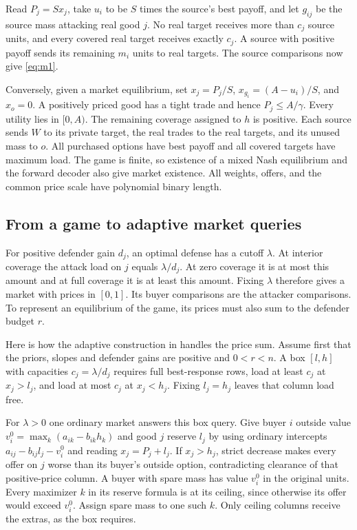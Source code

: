 \documentclass[11pt]{article}
\begin{document}
Read \(P_j=Sx_j\), take \(u_i\) to be \(S\) times the source's best payoff,
and let \(g_{ij}\) be the source mass attacking real good \(j\). No real
target receives more than \(c_j\) source units, and every covered real
target receives exactly \(c_j\). A source with positive payoff sends its
remaining \(m_i\) units to real targets. The source comparisons now give
\eqref{eq:m1}.

Conversely, given a market equilibrium, set \(x_j=P_j/S\),
\(x_{g_i}=(A-u_i)/S\), and \(x_o=0\). A positively priced good has a
tight trade and hence \(P_j\le A/\gamma\). Every utility lies in
\([0,A)\). The remaining coverage assigned to \(h\) is positive. Each
source sends \(W\) to its private target, the real trades to the real
targets, and its unused mass to \(o\). All purchased options have best
payoff and all covered targets have maximum load. The game is finite,
so existence of a mixed Nash equilibrium and the forward decoder also
give market existence. All weights, offers, and the common price scale
have polynomial binary length.

\subsection{From a game to adaptive market queries}

For positive defender gain \(d_j\), an optimal defense has a cutoff
\(\lambda\). At interior coverage the attack load on \(j\) equals
\(\lambda/d_j\). At zero coverage it is at most this amount and at full
coverage it is at least this amount. Fixing \(\lambda\) therefore gives
a market with prices in \([0,1]\). Its buyer comparisons are the
attacker comparisons. To represent an equilibrium of the game, its prices
must also sum to the defender budget \(r\).

Here is how the adaptive construction in \cite[Theorem~3.1]{book} handles
the price sum. Assume first that the priors, slopes and defender gains are
positive and \(0<r<n\). A box \([l,h]\) with capacities
\(c_j=\lambda/d_j\) requires full best-response rows, load at least
\(c_j\) at \(x_j>l_j\), and load at most \(c_j\) at \(x_j<h_j\).
Fixing \(l_j=h_j\) leaves that column load free.

For \(\lambda>0\) one ordinary market answers this box query. Give buyer
\(i\) outside value \(v_i^0=\max_k(a_{ik}-b_{ik}h_k)\) and good \(j\)
reserve \(l_j\) by using ordinary intercepts
\(a_{ij}-b_{ij}l_j-v_i^0\) and reading \(x_j=P_j+l_j\).
If \(x_j>h_j\), strict decrease makes every offer on \(j\) worse than
its buyer's outside option, contradicting clearance of that positive-price column.
A buyer with spare mass has value \(v_i^0\) in the original units.
Every maximizer \(k\) in its reserve formula is at its ceiling, since
otherwise its offer would exceed \(v_i^0\). Assign spare mass to one
such \(k\). Only ceiling columns receive the extras, as the box requires.
\end{document}
